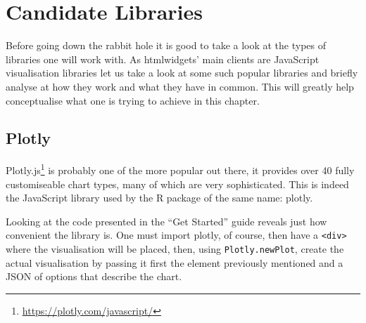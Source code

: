 \documentclass[
]{krantz}
\renewcommand{\href}[2]{#2\footnote{\url{#1}}}
\begin{document}
\hypertarget{candidate-libraries}{%
\section{Candidate Libraries}\label{candidate-libraries}}

Before going down the rabbit hole it is good to take a look at the types of libraries one will work with. As htmlwidgets' main clients are JavaScript visualisation libraries let us take a look at some such popular libraries and briefly analyse at how they work and what they have in common. This will greatly help conceptualise what one is trying to achieve in this chapter.

\hypertarget{plotly}{%
\subsection{Plotly}\label{plotly}}

\href{https://plotly.com/javascript/}{Plotly.js} is probably one of the more popular out there, it provides over 40 fully customiseable chart types, many of which are very sophisticated. This is indeed the JavaScript library used by the R package of the same name: plotly.

Looking at the code presented in the ``Get Started'' guide reveals just how convenient the library is. One must import plotly, of course, then have a \texttt{\textless{}div\textgreater{}} where the visualisation will be placed, then, using \texttt{Plotly.newPlot}, create the actual visualisation by passing it first the element previously mentioned and a JSON of options that describe the chart.
\end{document}
